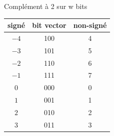\begin{frame}{Complément à 2 sur w bits}

  \bigskip
  \begin{center}
    \renewcommand{\arraystretch}{1.15}
    \begin{tabular}{|c|c||c|}
      \hline
      \textbf{signé} & \textbf{bit vector} & \textbf{non-signé} \\
      \hline
      $-4$ & 100 & 4 \\ \hline
      $-3$ & 101 & 5 \\ \hline
      $-2$ & 110 & 6 \\ \hline
      $-1$ & 111 & 7 \\ \hline
      $0$  & 000 & 0 \\ \hline
      $1$  & 001 & 1 \\ \hline
      $2$  & 010 & 2 \\ \hline
      $3$  & 011 & 3 \\ \hline
    \end{tabular}
  \end{center}
\end{frame}

